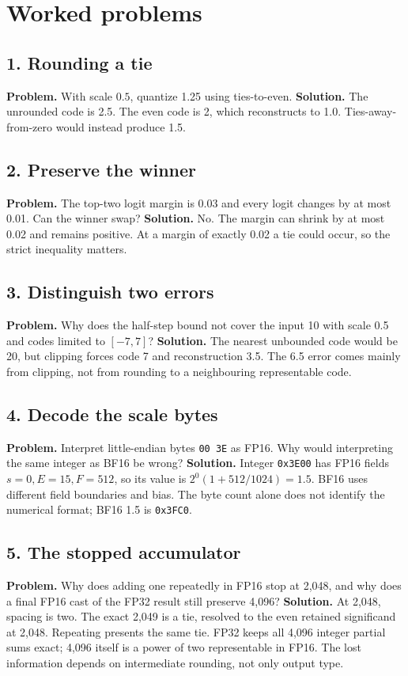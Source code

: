 \section{Worked problems}
\subsection*{1. Rounding a tie}
\textbf{Problem.} With scale $0.5$, quantize 1.25 using ties-to-even.
\textbf{Solution.} The unrounded code is 2.5. The even code is 2,
which reconstructs to 1.0. Ties-away-from-zero would instead produce 1.5.
\subsection*{2. Preserve the winner}
\textbf{Problem.} The top-two logit margin is 0.03 and every logit changes
by at most 0.01. Can the winner swap?
\textbf{Solution.} No. The margin can shrink by at most 0.02 and remains
positive. At a margin of exactly 0.02 a tie could occur, so the strict
inequality matters.
\subsection*{3. Distinguish two errors}
\textbf{Problem.} Why does the half-step bound not cover the input 10
with scale 0.5 and codes limited to $[-7,7]$?
\textbf{Solution.} The nearest unbounded code would be 20, but clipping
forces code 7 and reconstruction 3.5. The 6.5 error comes mainly from
clipping, not from rounding to a neighbouring representable code.
\subsection*{4. Decode the scale bytes}
\textbf{Problem.} Interpret little-endian bytes \texttt{00 3E}
as FP16. Why would interpreting the same integer as BF16 be wrong?
\textbf{Solution.} Integer \texttt{0x3E00} has FP16 fields
$s=0,E=15,F=512$, so its value is $2^0(1+512/1024)=1.5$.
BF16 uses different field boundaries and bias. The byte count alone
does not identify the numerical format; BF16 1.5 is \texttt{0x3FC0}.
\subsection*{5. The stopped accumulator}
\textbf{Problem.} Why does adding one repeatedly in FP16 stop at 2,048,
and why does a final FP16 cast of the FP32 result still preserve 4,096?
\textbf{Solution.} At 2,048, spacing is two. The exact 2,049 is a tie,
resolved to the even retained significand at 2,048. Repeating presents
the same tie. FP32 keeps all 4,096 integer partial sums exact; 4,096
itself is a power of two representable in FP16. The lost information
depends on intermediate rounding, not only output type.
